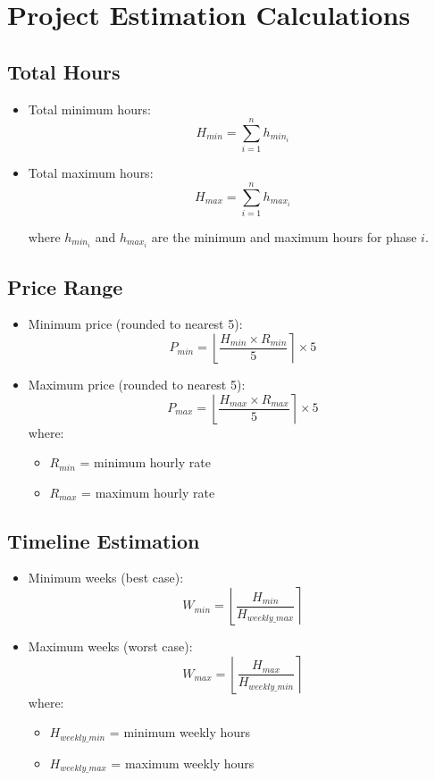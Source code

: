 \documentclass{article}
\begin{document}
\section*{Project Estimation Calculations}

\subsection*{Total Hours}

\begin{itemize}
\item Total minimum hours:
\[
    H_{min} = \sum_{i=1}^{n} h_{min_i}
\]

\item Total maximum hours:
\[
    H_{max} = \sum_{i=1}^{n} h_{max_i}
\]

where $h_{min_i}$ and $h_{max_i}$ are the minimum and maximum hours for phase $i$.
\end{itemize}

\subsection*{Price Range}

\begin{itemize}
\item Minimum price (rounded to nearest 5):
\[
    P_{min} = \left\lfloor\frac{H_{min} \times R_{min}}{5}\right\rceil \times 5
\]

\item Maximum price (rounded to nearest 5):
\[
    P_{max} = \left\lfloor\frac{H_{max} \times R_{max}}{5}\right\rceil \times 5
\]
where:
\begin{itemize}
    \item $R_{min}$ = minimum hourly rate
    \item $R_{max}$ = maximum hourly rate
\end{itemize}
\end{itemize}

\subsection*{Timeline Estimation}

\begin{itemize}
\item Minimum weeks (best case):
\[
    W_{min} = \left\lfloor\frac{H_{min}}{H_{weekly\_max}}\right\rceil
\]

\item Maximum weeks (worst case):
\[
    W_{max} = \left\lfloor\frac{H_{max}}{H_{weekly\_min}}\right\rceil
\]
where:
\begin{itemize}
    \item $H_{weekly\_min}$ = minimum weekly hours
    \item $H_{weekly\_max}$ = maximum weekly hours
\end{itemize}
\end{itemize}
\end{document}
